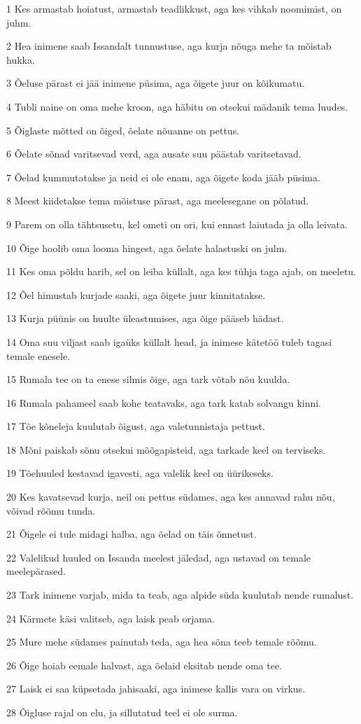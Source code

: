 \par 1 Kes armastab hoiatust, armastab teadlikkust, aga kes vihkab noomimist, on juhm.
\par 2 Hea inimene saab Issandalt tunnustuse, aga kurja nõuga mehe ta mõistab hukka.
\par 3 Õeluse pärast ei jää inimene püsima, aga õigete juur on kõikumatu.
\par 4 Tubli naine on oma mehe kroon, aga häbitu on otsekui mädanik tema luudes.
\par 5 Õiglaste mõtted on õiged, õelate nõuanne on pettus.
\par 6 Õelate sõnad varitsevad verd, aga ausate suu päästab varitsetavad.
\par 7 Õelad kummutatakse ja neid ei ole enam, aga õigete koda jääb püsima.
\par 8 Meest kiidetakse tema mõistuse pärast, aga meelesegane on põlatud.
\par 9 Parem on olla tähtsusetu, kel ometi on ori, kui ennast laiutada ja olla leivata.
\par 10 Õige hoolib oma looma hingest, aga õelate halastuski on julm.
\par 11 Kes oma põldu harib, sel on leiba küllalt, aga kes tühja taga ajab, on meeletu.
\par 12 Õel himustab kurjade saaki, aga õigete juur kinnitatakse.
\par 13 Kurja püünis on huulte üleastumises, aga õige pääseb hädast.
\par 14 Oma suu viljast saab igaüks küllalt head, ja inimese kätetöö tuleb tagasi temale enesele.
\par 15 Rumala tee on ta enese silmis õige, aga tark võtab nõu kuulda.
\par 16 Rumala pahameel saab kohe teatavaks, aga tark katab solvangu kinni.
\par 17 Tõe kõneleja kuulutab õigust, aga valetunnistaja pettust.
\par 18 Mõni paiskab sõnu otsekui mõõgapisteid, aga tarkade keel on terviseks.
\par 19 Tõehuuled kestavad igavesti, aga valelik keel on üürikeseks.
\par 20 Kes kavatsevad kurja, neil on pettus südames, aga kes annavad rahu nõu, võivad rõõmu tunda.
\par 21 Õigele ei tule midagi halba, aga õelad on täis õnnetust.
\par 22 Valelikud huuled on Issanda meelest jäledad, aga ustavad on temale meelepärased.
\par 23 Tark inimene varjab, mida ta teab, aga alpide süda kuulutab nende rumalust.
\par 24 Kärmete käsi valitseb, aga laisk peab orjama.
\par 25 Mure mehe südames painutab teda, aga hea sõna teeb temale rõõmu.
\par 26 Õige hoiab eemale halvast, aga õelaid eksitab nende oma tee.
\par 27 Laisk ei saa küpsetada jahisaaki, aga inimese kallis vara on virkus.
\par 28 Õigluse rajal on elu, ja sillutatud teel ei ole surma.

